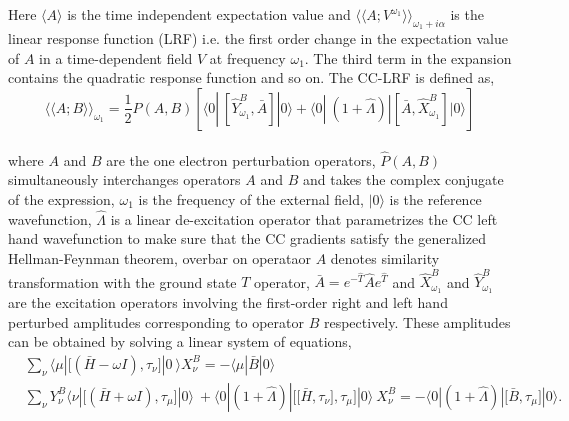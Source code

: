 Here $\langle A \rangle$ is the time independent expectation value and
${\langle\langle A;V^{\omega_1}\rangle\rangle}_{\omega_1 + i\alpha}$
is the linear response function (LRF) i.e. the first order change in the expectation value of 
$A$ in a time-dependent field $V$ at frequency $\omega_1$. The third term in the expansion
contains the quadratic response function and so on. The CC-LRF is defined as,
\\
\begin{equation}
{\langle\langle A;B\rangle\rangle}_{\omega_1} =  \frac{1}{2}\hat{P}(A,B)[\langle 0 | \
[\hat{Y}^{B}_{\omega_1}, \bar{A}]|0\rangle + \langle 0 | \
(1 + \hat{\Lambda})|[\bar{A},\hat{X}^{B}_{\omega_1}]|0\rangle]
\end{equation}
\\
where $A$ and $B$ are the one electron perturbation operators,
$\hat{P}(A,B)$ simultaneously interchanges operators $A$ and $B$
and takes the complex conjugate of the expression,
$\omega_1$ is the frequency of the external field, 
$|0\rangle$ is the reference wavefunction, $\hat{\Lambda}$ is 
a linear de-excitation operator that parametrizes the CC left hand 
wavefunction to make sure that the CC gradients satisfy the 
generalized Hellman-Feynman theorem\cite{Koch90},
overbar on operataor $A$ denotes similarity transformation with the ground state
$T$ operator, $\bar{A} = e^{-\hat{T}}\hat{A}e^{\hat{T}}$
and $\hat{X}^{B}_{\omega_1}$ and $\hat{Y}^{B}_{\omega_1}$ are the excitation operators involving 
the first-order right and left hand perturbed amplitudes corresponding to operator 
$B$ respectively. These amplitudes can be obtained by solving a linear system
of equations,
\\
\begin{equation}
\begin{split}
&\sum_\nu\langle \mu | \big[(\bar{H} - \omega I),\tau_\nu\big] |0 \
\rangle X_{\nu}^{B} = -\langle \mu|\bar{B}|0 \rangle \\
&\sum_\nu Y_{\nu}^{B}\langle \nu | \big[(\bar{H} + \omega I),\tau_\mu\big] |0 \rangle \
+ \langle 0|(1 + \hat{\Lambda})|\big[\big[\bar{H},\tau_\nu\big],\tau_\mu\big] |0 \rangle\  X_{\nu}^{B}
= -\langle 0|(1 + \hat{\Lambda})|\big[\bar{B},\tau_\mu\big] |0 \rangle .\\
\end{split}
\end{equation}

